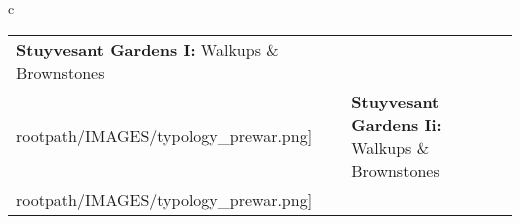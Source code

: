 \begin{table}[H]
        \begin{tabular}{c}
        \begin{tabular}{m{1.25in} m{2in} m{.1in} m{1.25in} m{2in}}
\textbf{Stuyvesant Gardens I:} {Walkups \& Brownstones} & \texttt{[image: \\rootpath/IMAGES/typology\_prewar.png]} & & \textbf{Stuyvesant Gardens Ii:} {Walkups \& Brownstones} & \texttt{[image: \\rootpath/IMAGES/typology\_prewar.png]}
\end{tabular}\end{tabular}
        \end{table}